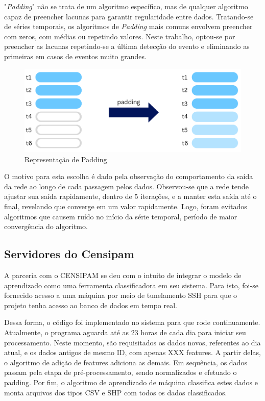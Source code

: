 "\textit{Padding}" não se trata de um algoritmo específico, mas de qualquer algoritmo capaz de preencher lacunas para garantir regularidade entre dados. Tratando-se de séries temporais, os algoritmos de \textit{Padding} mais comuns envolvem preencher com zeros, com médias ou repetindo valores. Neste trabalho, optou-se por preencher as lacunas repetindo-se a última detecção do evento e eliminando as primeiras em casos de eventos muito grandes. 

\begin{figure}[ht]
    \centering
    \includegraphics[scale=0.5]{tg1/figuras/padding.png}
    \caption{Representação de Padding}
    \label{fig:padding}
\end{figure}


O motivo para esta escolha é dado pela observação do comportamento da saída da rede ao longo de cada passagem pelos dados. Observou-se que a rede tende ajustar sua saída rapidamente, dentro de 5 iterações, e a manter esta saída até o final, revelando que converge em um valor rapidamente. Logo, foram evitados algoritmos que causem ruído no início da série temporal, período de maior convergência do algoritmo.


\subsection{Servidores do Censipam}

A parceria com o CENSIPAM se deu com o intuito de integrar o modelo de aprendizado como uma ferramenta classificadora em seu sistema. Para isto, foi-se fornecido acesso a uma máquina por meio de tunelamento SSH para que o projeto tenha acesso ao banco de  dados em tempo real.

Dessa forma, o código foi implementado no sistema para que rode continuamente. Atualmente, o programa aguarda até as 23 horas de cada dia para iniciar seu processamento. Neste momento, são requisitados os dados novos, referentes ao dia atual, e os dados antigos de mesmo ID, com apenas XXX features. A partir delas, o algoritmo de adição de features adiciona as demais. Em sequência, os dados passam pela etapa de pré-processamento, sendo normalizados e efetuado o padding. Por fim, o algoritmo de aprendizado de máquina classifica estes dados e monta arquivos dos tipos CSV e SHP com todos os dados classificados.

